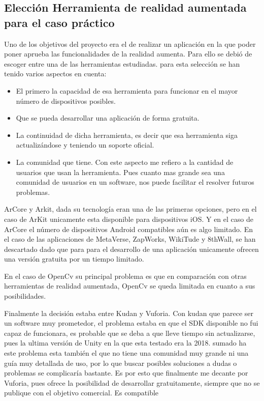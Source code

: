 \subsection{Elección Herramienta de realidad aumentada para el caso práctico}

Uno de los objetivos del proyecto era el de realizar un aplicación en la que poder poner aprueba las funcionalidades de la realidad aumenta. Para ello se debió de escoger entre una de las herramientas estudiadas. para esta selección se han tenido varios aspectos en cuenta: 
\begin{itemize}
	\item El primero la capacidad de esa herramienta para funcionar en el mayor número de dispositivos posibles.
	\item Que se pueda desarrollar una aplicación de forma gratuita.
	\item La continuidad de dicha herramienta, es decir que esa herramienta siga actualizándose y teniendo un soporte oficial.
	\item La comunidad que tiene. Con este aspecto me refiero a la cantidad de usuarios que usan la herramienta. Pues cuanto mas grande sea una comunidad de usuarios en un software, nos puede facilitar el resolver futuros problemas.
	
\end{itemize}

ArCore y Arkit, dada su tecnología eran una de las primeras opciones, pero en el caso de ArKit unicamente esta disponible para dispositivos iOS. Y en el caso de ArCore el número de dispositivos Android compatibles aún es algo limitado.
En el caso de las aplicaciones de MetaVerse, ZapWorks, WikiTude y 8thWall, se han descartado dado que para para el desarrollo de una aplicación unicamente ofrecen una versión gratuita por un tiempo limitado.

En el caso de OpenCv su principal problema es que en comparación con otras herramientas de realidad aumentada, OpenCv se queda limitada en cuanto a sus posibilidades.

Finalmente la decisión estaba entre Kudan y Vuforia. Con kudan que parece ser un software muy prometedor, el problema estaba en que el SDK disponible no fui capaz de funcionara, es probable que se deba a que lleve tiempo sin actualizarse, pues la ultima versión de Unity en la que esta testado era la 2018. sumado ha este problema esta también el que no tiene una comunidad muy grande ni una guía muy detallada de uso, por lo que buscar posibles soluciones a dudas o problemas se complicaría bastante.
Es por esto que finalmente me decante por Vuforia, pues  ofrece la posibilidad de desarrollar gratuitamente, siempre que no se publique con el objetivo comercial. Es compatible 


